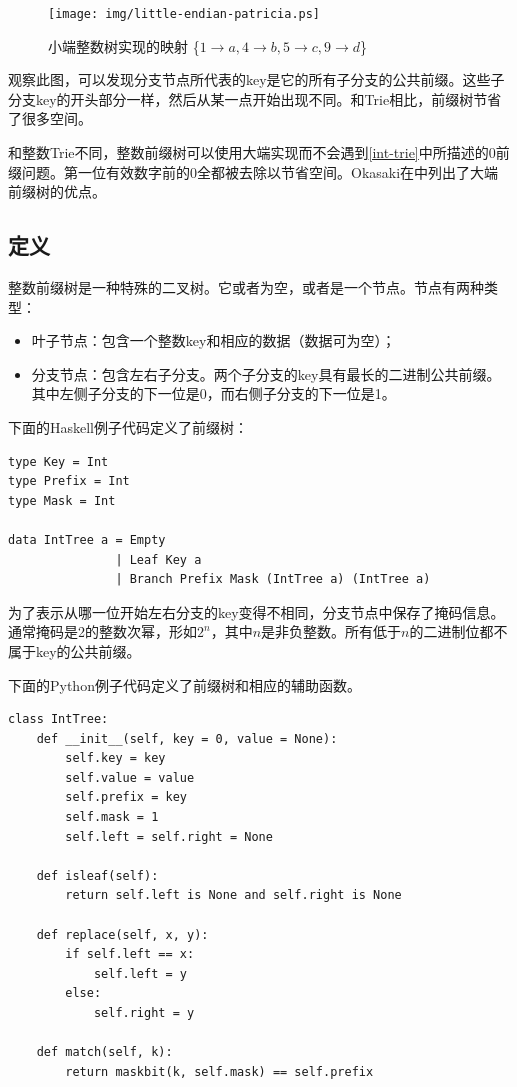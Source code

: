 \documentclass[b5paper]{ctexart}
\begin{document}
\begin{figure}[htbp]
  \centering
  \texttt{[image: img/little-endian-patricia.ps]}
  \caption{小端整数树实现的映射
     \{$ 1 \rightarrow a, 4 \rightarrow b, 5 \rightarrow c, 9 \rightarrow d$\}}
  \label{fig:little-endian-patricia}
\end{figure}

观察此图，可以发现分支节点所代表的key是它的所有子分支的公共前缀。这些子分支key的开头部分一样，然后从某一点开始出现不同。和Trie相比，前缀树节省了很多空间。

和整数Trie不同，整数前缀树可以使用大端实现而不会遇到\ref{int-trie}中所描述的0前缀问题。第一位有效数字前的0全都被去除以节省空间。Okasaki在\cite{okasaki-int-map}中列出了大端前缀树的优点。

\subsection{定义}

整数前缀树是一种特殊的二叉树。它或者为空，或者是一个节点。节点有两种类型：

\begin{itemize}
\item 叶子节点：包含一个整数key和相应的数据（数据可为空）；
\item 分支节点：包含左右子分支。两个子分支的key具有最长的二进制公共前缀。其中左侧子分支的下一位是0，而右侧子分支的下一位是1。
\end{itemize}

下面的Haskell例子代码定义了前缀树：

\lstset{language=Haskell}
\begin{lstlisting}[style=Haskell]
type Key = Int
type Prefix = Int
type Mask = Int

data IntTree a = Empty
               | Leaf Key a
               | Branch Prefix Mask (IntTree a) (IntTree a)
\end{lstlisting}

为了表示从哪一位开始左右分支的key变得不相同，分支节点中保存了掩码信息。通常掩码是2的整数次幂，形如$2^n$，其中$n$是非负整数。所有低于$n$的二进制位都不属于key的公共前缀。

下面的Python例子代码定义了前缀树和相应的辅助函数。

\lstset{language=Python}
\begin{lstlisting}
class IntTree:
    def __init__(self, key = 0, value = None):
        self.key = key
        self.value = value
        self.prefix = key
        self.mask = 1
        self.left = self.right = None

    def isleaf(self):
        return self.left is None and self.right is None

    def replace(self, x, y):
        if self.left == x:
            self.left = y
        else:
            self.right = y

    def match(self, k):
        return maskbit(k, self.mask) == self.prefix
\end{lstlisting}
\end{document}
